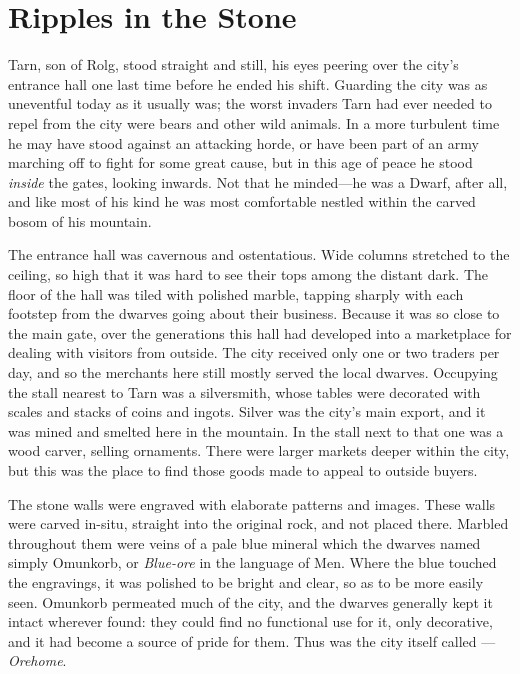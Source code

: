 \chapter{Ripples in the Stone}
Tarn, son of Rolg, stood straight and still, his eyes peering over the city's entrance hall one last time before he ended his shift.  Guarding the city was as uneventful today as it usually was; the worst invaders Tarn had ever needed to repel from the city were bears and other wild animals.  In a more turbulent time he may have stood against an attacking horde, or have been part of an army marching off to fight for some great cause, but in this age of peace he stood \emph{inside} the gates, looking inwards.  Not that he minded---he was a Dwarf, after all, and like most of his kind he was most comfortable nestled within the carved bosom of his mountain.

The entrance hall was cavernous and ostentatious.  Wide columns stretched to the ceiling, so high that it was hard to see their tops among the distant dark.  The floor of the hall was tiled with polished marble, tapping sharply with each footstep from the dwarves going about their business.  Because it was so close to the main gate, over the generations this hall had developed into a marketplace for dealing with visitors from outside.  The city received only one or two traders per day, and so the merchants here still mostly served the local dwarves.  Occupying the stall nearest to Tarn was a silversmith, whose tables were decorated with scales and stacks of coins and ingots.  Silver was the city's main export, and it was mined and smelted here in the mountain.  In the stall next to that one was a wood carver, selling ornaments.  There were larger markets deeper within the city, but this was the place to find those goods made to appeal to outside buyers.

The stone walls were engraved with elaborate patterns and images.  These walls were carved in-situ, straight into the original rock, and not placed there.  Marbled throughout them were veins of a pale blue mineral which the dwarves named simply Omunkorb, or \emph{Blue-ore} in the language of Men.  Where the blue touched the engravings, it was polished to be bright and clear, so as to be more easily seen.  Omunkorb permeated much of the city, and the dwarves generally kept it intact wherever found: they could find no functional use for it, only decorative, and it had become a source of pride for them.  Thus was the city itself called \korbarthrond---\emph{Orehome}.

